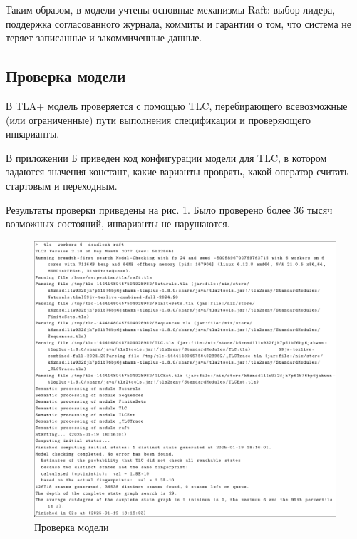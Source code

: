 Таким образом, в модели учтены основные механизмы Raft: выбор лидера, поддержка
согласованного журнала, коммиты и гарантии о том, что система не теряет
записанные и закоммиченные данные.

\subsection{Проверка модели}

В TLA+ модель проверяется с помощью TLC, перебирающего всевозможные (или
ограниченные) пути выполнения спецификации и проверяющего инварианты.

В приложении Б приведен код конфигурации модели для TLC, в котором задаются
значения констант, какие варианты проврять, какой оператор считать стартовым и
переходным.

Результаты проверки приведены на рис. \ref{fig:tla-09}. Было проверено более 36
тысяч возможных состояний, инварианты не нарушаются.

\begin{figure}
  \centering
  \includegraphics[scale=0.4]{inc/tla-09.png}
  \caption{Проверка модели}
  \label{fig:tla-09}
\end{figure}
